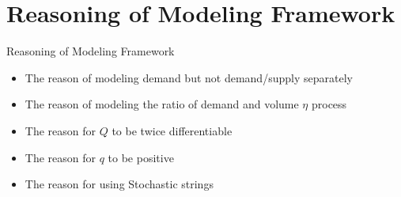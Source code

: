 \documentclass{beamer}
\begin{document}
\section{Reasoning of Modeling Framework}
\begin{frame}[shrink=30]{{\color{cyan}Reasoning of Modeling Framework}}
\bigskip
\begin{itemize}
\item The reason of modeling demand but not demand/supply separately


\vspace{10pt}
\item The reason of modeling the ratio of demand and volume $\eta$ process


\vspace{10pt}
\item The reason for $Q$ to be twice differentiable


\vspace{10pt}
\item The reason for $q$ to be positive


\vspace{10pt}
\item The reason for using Stochastic strings

\end{itemize}

\end{frame}


\end{document}

